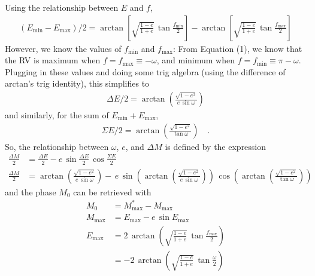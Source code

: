 \documentclass{article}
\begin{document}
Using the relationship between $E$ and $f$,
\begin{align}
    (E_{\mathrm{min}} - E_{\mathrm{max}})/2 =
        \arctan\left[ \sqrt{\frac{1-e}{1+e}} \,
            \tan \frac{f_{\mathrm{min}}}{2} \right] -
        \arctan\left[ \sqrt{\frac{1-e}{1+e}} \,
            \tan \frac{f_{\mathrm{max}}}{2} \right]
\end{align}
However, we know the values of $f_{\mathrm{min}}$ and $f_{\mathrm{max}}$: From
Equation (1), we know that the RV is maximum when $f=f_{\mathrm{max}} \equiv
-\omega$, and minimum when $f=f_{\mathrm{min}} \equiv \pi-\omega$.
Plugging in these values and doing some trig algebra (using the difference of
arctan's trig identity), this simplifies to
\begin{align}
    \Delta E / 2 = \arctan\left(\frac{\sqrt{1 - e^2}}{e\,\sin\omega}\right)
\end{align}
and similarly, for the sum of $E_{\mathrm{min}} + E_{\mathrm{max}}$,
\begin{align}
    \Sigma E / 2 = \arctan\left(\frac{\sqrt{1 - e^2}}{\tan\omega}\right)
        \quad .
\end{align}
So, the relationship between $\omega$, $e$, and $\Delta M$ is defined by the
expression
\begin{align}
    \frac{\Delta M}{2} &= \frac{\Delta E}{2} -
        e\, \sin\frac{\Delta E}{2} \, \cos\frac{\Sigma E}{2} \\
    \frac{\Delta M}{2} &=
        \arctan\left(\frac{\sqrt{1 - e^2}}{e\,\sin\omega}\right) -
        \,e \,
            \sin\left(\arctan\left(\frac{\sqrt{1 - e^2}}{e\,\sin\omega}\right)\right) \,
            \cos\left(\arctan\left(\frac{\sqrt{1 - e^2}}{\tan\omega}\right)\right)
\end{align}
and the phase $M_0$ can be retrieved with
\begin{align}
    M_0 &= M^*_{\mathrm{max}} - M_{\mathrm{max}} \\
    M_{\mathrm{max}} &= E_{\mathrm{max}} - e \, \sin E_{\mathrm{max}} \\
    E_{\mathrm{max}} &= 2\,\arctan\left(\sqrt{\frac{1-e}{1+e}} \,
        \tan\frac{f_{\mathrm{max}}}{2}\right) \\
    &= -2\,\arctan\left(\sqrt{\frac{1-e}{1+e}} \,
        \tan\frac{\omega}{2}\right) \\
\end{align}
\end{document}
